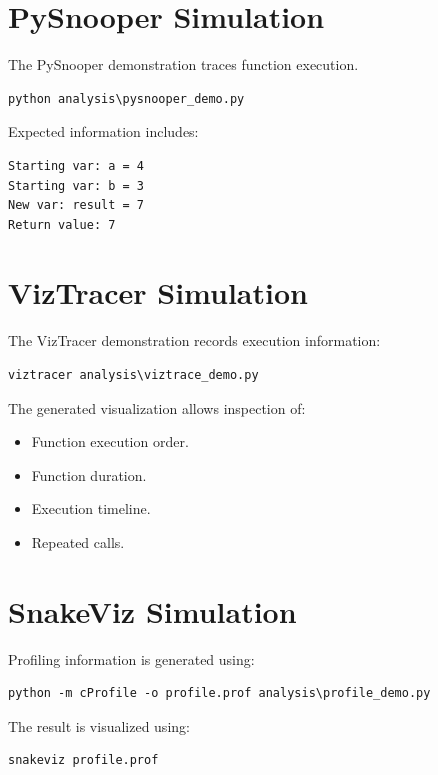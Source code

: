 \documentclass[12pt,a4paper]{report}
\begin{document}
\section{PySnooper Simulation}

The PySnooper demonstration traces function execution.

\begin{lstlisting}
python analysis\pysnooper_demo.py
\end{lstlisting}

Expected information includes:

\begin{lstlisting}
Starting var: a = 4
Starting var: b = 3
New var: result = 7
Return value: 7
\end{lstlisting}

\section{VizTracer Simulation}

The VizTracer demonstration records execution information:

\begin{lstlisting}
viztracer analysis\viztrace_demo.py
\end{lstlisting}

The generated visualization allows inspection of:

\begin{itemize}
    \item Function execution order.
    \item Function duration.
    \item Execution timeline.
    \item Repeated calls.
\end{itemize}

\section{SnakeViz Simulation}

Profiling information is generated using:

\begin{lstlisting}
python -m cProfile -o profile.prof analysis\profile_demo.py
\end{lstlisting}

The result is visualized using:

\begin{lstlisting}
snakeviz profile.prof
\end{lstlisting}
\end{document}
